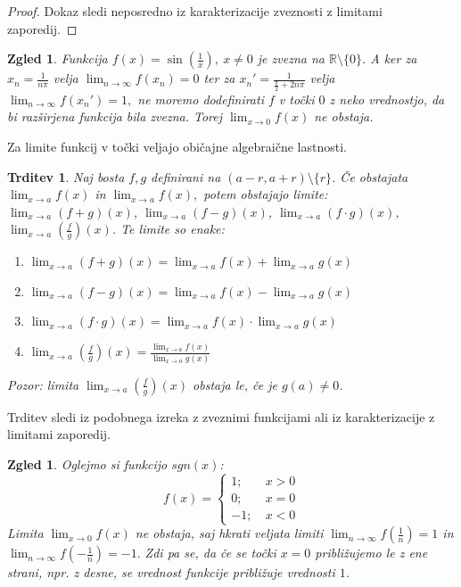 \documentclass[10pt, a4paper]{article}
\newtheorem{trditev}[izr]{Trditev}
\newtheorem{zgled}[izr]{Zgled}
\newenvironment{noticeC}{%
  \tcolorbox[%
  notitle,
  empty,
  enhanced,  %
  breakable,
  coltext=black, 
  fontupper=\rmfamily,
  noparskip,
  sharp corners,
  boxrule=-1pt,  %
  frame hidden,
  left=7pt,  %
  right=7pt,
  top=5pt,
  bottom=5pt,
  before skip=2.5ex plus 2pt,
  after skip=2.5ex plus 2pt,
  overlay unbroken and last={%
  },
  ]}
{\endtcolorbox}
\newenvironment{dokaz}%
  {\begin{noticeC}\begin{proof}}%
  {\end{proof}\end{noticeC}}
\newcommand{\R}{\mathbb {R}}
\newcommand{\limzap}[1]{\lim_{n \to \infty} {#1}}
\newcommand{\limf}[3]{\lim_{#1 \to #2} {#3}}
\begin{document}
\begin{dokaz}
    Dokaz sledi neposredno iz karakterizacije zveznosti z limitami zaporedij.
\end{dokaz}

\begin{zgled}
    Funkcija $f(x) = \sin \left( \frac{1}{x} \right),\ x \neq 0$ je zvezna na $\R \setminus \{0\}$.
    A ker za $x_n = \frac{1}{n \pi}$ velja $\limzap{f(x_n)} = 0$ ter za $x_n' = \frac{1}{\frac{\pi}{2} + 2n \pi}$ velja $\limzap{f(x_n')} = 1,$
    ne moremo dodefinirati $f$ v točki $0$ z neko vrednostjo, da bi razširjena funkcija bila zvezna.
    Torej $\limf{x}{0}{f(x)}$ ne obstaja.
\end{zgled}

Za limite funkcij v točki veljajo običajne algebraične lastnosti.

\begin{trditev}
    Naj bosta $f,g$ definirani na $(a-r, a+r) \setminus \{r\}$. Če obstajata $\limf{x}{a}{f(x)}$ in $\limf{x}{a}{f(x)},$ potem obstajajo limite:
    $\limf{x}{a}{(f+g)(x)}$, $\limf{x}{a}{(f-g)(x)}$, $\limf{x}{a}{(f \cdot g)(x)}$, $\limf{x}{a}{(\frac{f}{g})(x)}$.
    Te limite so enake:
    \begin{enumerate}
        \item $\limf{x}{a}{(f+g)(x)} = \limf{x}{a}{f(x)} + \limf{x}{a}{g(x)}$
        \item $\limf{x}{a}{(f-g)(x)} = \limf{x}{a}{f(x)} - \limf{x}{a}{g(x)}$
        \item $\limf{x}{a}{(f\cdot g)(x)} = \limf{x}{a}{f(x)} \cdot \limf{x}{a}{g(x)}$
        \item $\limf{x}{a}{(\frac{f}{g})(x)} = \frac{\limf{x}{a}{f(x)}}{\limf{x}{a}{g(x)}}$
    \end{enumerate}
    
    Pozor: limita $\limf{x}{a}{(\frac{f}{g})(x)}$ obstaja le, če je $g(a) \neq 0$.
\end{trditev}

Trditev sledi iz podobnega izreka z zveznimi funkcijami ali iz karakterizacije z limitami zaporedij.

\begin{zgled}
    Oglejmo si funkcijo $sgn (x)$:
    $$f(x) = \begin{cases}
        1;\ &x>0\\
        0;\ &x = 0\\
        -1;\ &x<0
    \end{cases}$$
    Limita $\limf{x}{0}{f(x)}$ ne obstaja, saj hkrati veljata limiti $\limzap{f(\frac{1}{n})} = 1$ in $\limzap{f(-\frac{1}{n})} = -1.$
    Zdi pa se, da če se točki $x=0$ približujemo le z ene strani, npr. z desne, se vrednost funkcije približuje vrednosti $1$.
\end{zgled}
\end{document}
